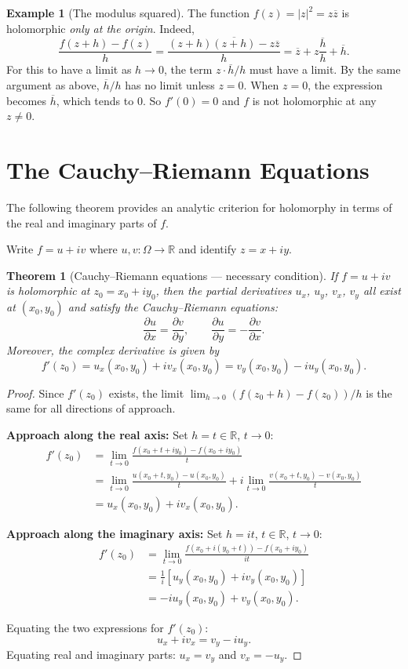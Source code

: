 \documentclass[12pt,a4paper,openany]{book}
\theoremstyle{definition}
\newtheorem{example}[definition]{Example}
\theoremstyle{plain}
\newtheorem{theorem}[definition]{Theorem}
\theoremstyle{remark}
\newcommand{\R}{\mathbb{R}}
\newcommand{\abs}[1]{\left|#1\right|}
\newcommand{\conj}[1]{\overline{#1}}
\begin{document}
\begin{example}[The modulus squared]
\label{ex:modulus-squared}
The function $f(z) = \abs{z}^2 = z\conj{z}$ is holomorphic \emph{only at the origin}. Indeed,
\[
  \frac{f(z+h)-f(z)}{h} = \frac{(z+h)\conj{(z+h)}-z\conj{z}}{h} = \conj{z} + z\frac{\conj{h}}{h} + \conj{h}.
\]
For this to have a limit as $h\to 0$, the term $z\cdot\conj{h}/h$ must have a limit. By the same argument as above, $\conj{h}/h$ has no limit unless $z=0$. When $z=0$, the expression becomes $\conj{h}$, which tends to $0$. So $f'(0)=0$ and $f$ is not holomorphic at any $z\neq 0$.
\end{example}

\section{The Cauchy--Riemann Equations}
\label{sec:cauchy-riemann}

The following theorem provides an analytic criterion for holomorphy in terms of the real and imaginary parts of $f$.

Write $f = u + iv$ where $u,v:\Omega\to\R$ and identify $z = x+iy$.

\begin{theorem}[Cauchy--Riemann equations --- necessary condition]
\label{thm:CR-necessary}
If $f = u+iv$ is holomorphic at $z_0 = x_0+iy_0$, then the partial derivatives $u_x$, $u_y$, $v_x$, $v_y$ all exist at $(x_0,y_0)$ and satisfy the \emph{Cauchy--Riemann equations}:
\[
  \boxed{\frac{\partial u}{\partial x} = \frac{\partial v}{\partial y}, \qquad \frac{\partial u}{\partial y} = -\frac{\partial v}{\partial x}.}
\]
Moreover, the complex derivative is given by
\[
  f'(z_0) = u_x(x_0,y_0) + iv_x(x_0,y_0) = v_y(x_0,y_0) - iu_y(x_0,y_0).
\]
\end{theorem}

\begin{proof}
Since $f'(z_0)$ exists, the limit $\lim_{h\to 0}(f(z_0+h)-f(z_0))/h$ is the same for all directions of approach.

\textbf{Approach along the real axis:} Set $h = t\in\R$, $t\to 0$:
\begin{align*}
  f'(z_0) &= \lim_{t\to 0}\frac{f(x_0+t+iy_0)-f(x_0+iy_0)}{t} \\
           &= \lim_{t\to 0}\frac{u(x_0+t,y_0)-u(x_0,y_0)}{t} + i\lim_{t\to 0}\frac{v(x_0+t,y_0)-v(x_0,y_0)}{t} \\
           &= u_x(x_0,y_0) + iv_x(x_0,y_0).
\end{align*}

\textbf{Approach along the imaginary axis:} Set $h = it$, $t\in\R$, $t\to 0$:
\begin{align*}
  f'(z_0) &= \lim_{t\to 0}\frac{f(x_0+i(y_0+t))-f(x_0+iy_0)}{it} \\
           &= \frac{1}{i}\left[u_y(x_0,y_0)+iv_y(x_0,y_0)\right] \\
           &= -iu_y(x_0,y_0) + v_y(x_0,y_0).
\end{align*}

Equating the two expressions for $f'(z_0)$:
\[
  u_x + iv_x = v_y - iu_y.
\]
Equating real and imaginary parts: $u_x = v_y$ and $v_x = -u_y$.
\end{proof}
\end{document}
